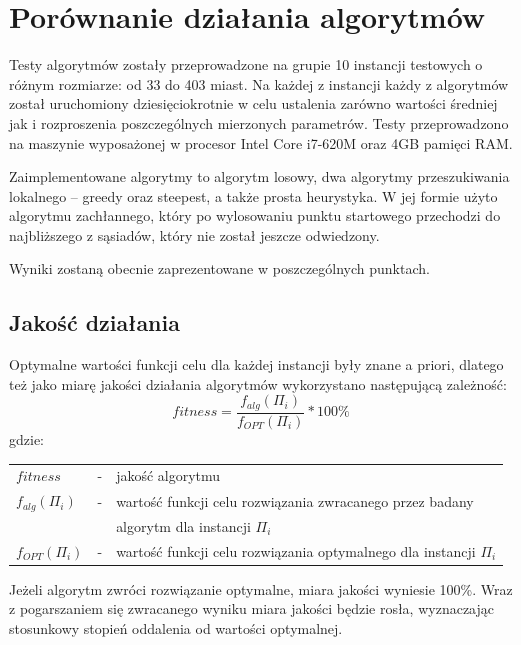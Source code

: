 \section{Porównanie działania algorytmów}
Testy algorytmów zostały przeprowadzone na grupie 10 instancji testowych o różnym rozmiarze: od 33 do 403 miast. Na każdej z instancji każdy z algorytmów został uruchomiony dziesięciokrotnie w celu ustalenia zarówno wartości średniej jak i rozproszenia poszczególnych mierzonych parametrów. Testy przeprowadzono na maszynie wyposażonej w procesor Intel Core i7-620M oraz 4GB pamięci RAM. 

Zaimplementowane algorytmy to algorytm losowy, dwa algorytmy przeszukiwania lokalnego -- greedy oraz steepest, a także prosta heurystyka. W jej formie użyto algorytmu zachłannego, który po wylosowaniu punktu startowego przechodzi do najbliższego z sąsiadów, który nie został jeszcze odwiedzony.

Wyniki zostaną obecnie zaprezentowane w poszczególnych punktach.

\subsection{Jakość działania}
Optymalne wartości funkcji celu dla każdej instancji były znane a priori, dlatego też jako miarę jakości działania algorytmów wykorzystano następującą zależność:
\begin{equation*}
fitness = \frac{f_{alg}(\Pi_i)}{f_{OPT}(\Pi_i)}*100\%
\end{equation*}
gdzie:

\begin{table}[h!]
       \begin{tabular}{lll}
       	$fitness$ & - & jakość algorytmu\\ 
        $f_{alg}(\Pi_{i})$ & - & wartość funkcji celu rozwiązania zwracanego przez badany \\
        &&algorytm dla instancji $\Pi_i$\\ 
		$f_{OPT}(\Pi_{i})$ & - & wartość funkcji celu rozwiązania optymalnego dla instancji $\Pi_i$
		\end{tabular}
\end{table}
\noindent Jeżeli algorytm zwróci rozwiązanie optymalne, miara jakości wyniesie 100\%. Wraz z pogarszaniem się zwracanego wyniku miara jakości będzie rosła, wyznaczając stosunkowy stopień oddalenia od wartości optymalnej.

